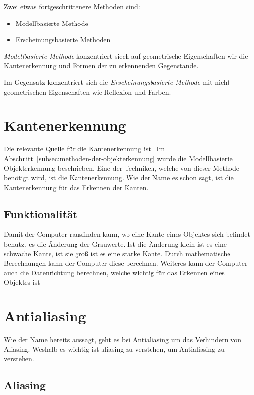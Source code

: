 Zwei etwas fortgeschrittenere Methoden sind:

\begin{itemize}
    \item Modellbasierte Methode
    \item Erscheinungsbasierte Methoden
\end{itemize}

\emph{Modellbasierte Methode} konzentriert siech auf geometrische Eigenschaften wir die Kantenerkennung und Formen der zu erkennenden Gegenstande.

Im Gegensatz konzentriert sich die \emph{Erscheinungsbasierte Methode} mit nicht geometrischen Eigenschaften wie Reflexion und Farben.

\section{Kantenerkennung}\label{sec:kantenerkennung}

Die relevante Quelle für die Kantenerkennung ist~\cite{Lordemann}
Im Abschnitt~\ref{subsec:methoden-der-objekterkennung} wurde die Modellbasierte Objekterkennung beschrieben.
Eine der Techniken, welche von dieser Methode benötigt wird, ist die Kantenerkennung.
Wie der Name es schon sagt, ist die Kantenerkennung für das Erkennen der Kanten.

\subsection{Funktionalität}
\label{subsec:funktionalitaet}

Damit der Computer rausfinden kann, wo eine Kante eines Objektes sich befindet benutzt es die Änderung der Grauwerte.
Ist die Änderung klein ist es eine schwache Kante, ist sie groß ist es eine starke Kante.
Durch mathematische Berechnungen kann der Computer diese berechnen.
Weiteres kann der Computer auch die Datenrichtung berechnen, welche wichtig für das Erkennen eines Objektes ist

\section{Antialiasing}
\label{sec:antialiasing}

Wie der Name bereits aussagt, geht es bei Antialiasing um das Verhindern von Aliasing.
Weshalb es wichtig ist aliasing zu verstehen, um Antialiasing zu verstehen.

\subsection{Aliasing}
\label{subsec:aliasing}

